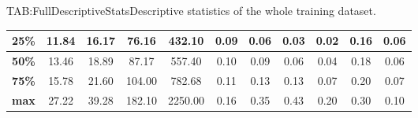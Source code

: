 \begin{landscape}
\begin{table}[Complete Descriptive Statistics]{TAB:FullDescriptiveStats}{Descriptive statistics of the whole training dataset.}
\begin{adjustbox}{width=1\linewidth}
\begin{tabular}{|c|*{10}{c|}}
                \hline
                \textbf{25\%}    & 11.84                          & 16.17                           & 76.16                             & 432.10                       & 0.09                               & 0.06                                & 0.03                              & 0.02                                   & 0.16                             & 0.06                                      \\
                \hline
                \textbf{50\%}    & 13.46                          & 18.89                           & 87.17                             & 557.40                       & 0.10                               & 0.09                                & 0.06                              & 0.04                                   & 0.18                             & 0.06                                      \\
                \hline
                \textbf{75\%}    & 15.78                          & 21.60                           & 104.00                            & 782.68                       & 0.11                               & 0.13                                & 0.13                              & 0.07                                   & 0.20                             & 0.07                                      \\
                \hline
                \textbf{max}     & 27.22                          & 39.28                           & 182.10                            & 2250.00                      & 0.16                               & 0.35                                & 0.43                              & 0.20                                   & 0.30                             & 0.10                                      \\
                \hline
            \end{tabular}

        \end{adjustbox}

        \bigskip


\end{table}
\end{landscape}
